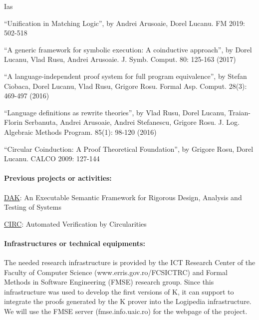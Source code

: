 \begin{sitedescription}{Ias}
\begin{compactitem}
\item ``Unification in Matching Logic'', by Andrei Arusoaie, Dorel Lucanu. FM 2019: 502-518
\item ``A generic framework for symbolic execution: A coinductive approach'', by Dorel Lucanu, Vlad Rusu, Andrei Arusoaie. J. Symb. Comput. 80: 125-163 (2017)
\item ``A language-independent proof system for full program equivalence'', by Stefan Ciobaca, Dorel Lucanu, Vlad Rusu, Grigore Rosu. Formal Asp. Comput. 28(3): 469-497 (2016)
\item ``Language definitions as rewrite theories'', by Vlad Rusu, Dorel Lucanu, Traian-Florin Serbanuta, Andrei Arusoaie, Andrei Stefanescu, Grigore Rosu. J. Log. Algebraic Methods Program. 85(1): 98-120 (2016)
\item ``Circular Coinduction: A Proof Theoretical Foundation'', by Grigore Rosu, Dorel Lucanu. CALCO 2009: 127-144
\end{compactitem}

\paragraph*{Previous projects or activities:}


\begin{compactitem}
\item \href{https://fmse.info.uaic.ro/grant/dak/}{DAK}: An Executable Semantic Framework for Rigorous Design, Analysis and Testing of Systems
\item \href{https://fmse.info.uaic.ro/grant/circ/}{CIRC}: Automated Verification by Circularities
\end{compactitem}

\paragraph*{Infrastructures or technical equipments:}


\begin{compactitem}
\item The needed research infrastructure is provided by the ICT Research Center of the Faculty of Computer Science (www.erris.gov.ro/FCSICTRC) and Formal Methods in Software Engineering (FMSE) research group. Since this infrastructure was used to develop the first versions of K, it can support to integrate the proofs generated by the K prover into the Logipedia infrastructure. We will use the FMSE server (fmse.info.uaic.ro) for the webpage of the project. 
\end{compactitem}


\end{sitedescription}
